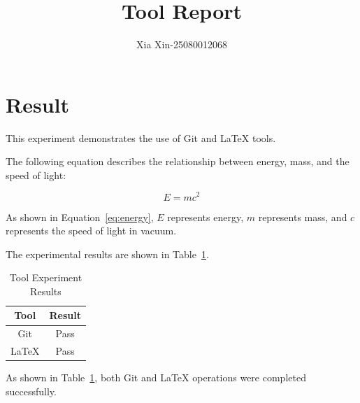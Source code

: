 \documentclass{article}
\begin{document}
\title{Tool Report}
\author{Xia Xin-25080012068}
\maketitle

\section{Result}

This experiment demonstrates the use of Git and LaTeX tools.

The following equation describes the relationship between energy,
mass, and the speed of light:

\begin{equation}
E = mc^2
\label{eq:energy}
\end{equation}

As shown in Equation~\eqref{eq:energy}, $E$ represents energy,
$m$ represents mass, and $c$ represents the speed of light in vacuum.

The experimental results are shown in Table~\ref{tab:result}.

\begin{table}[htbp]
\centering
\caption{Tool Experiment Results}
\label{tab:result}
\begin{tabular}{cc}
\hline
Tool & Result \\
\hline
Git & Pass \\
LaTeX & Pass \\
\hline
\end{tabular}
\end{table}

As shown in Table~\ref{tab:result}, both Git and LaTeX operations
were completed successfully.
\end{document}
